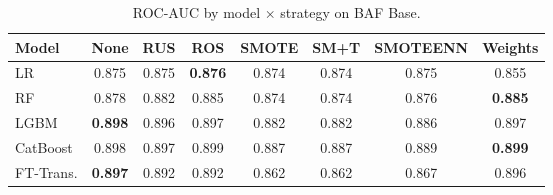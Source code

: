 \begin{table}[H]
\centering
\caption{ROC-AUC by model $\times$ strategy on BAF Base.}
\label{tab:factorial_baf_rocauc}
\begin{tabular}{l c c c c c c c}
\toprule
Model & None & RUS & ROS & SMOTE & SM+T & SMOTEENN & Weights \\
\midrule
LR         & 0.875 & 0.875 & \textbf{0.876} & 0.874 & 0.874 & 0.875 & 0.855 \\
RF         & 0.878 & 0.882 & 0.885 & 0.874 & 0.874 & 0.876 & \textbf{0.885} \\
LGBM       & \textbf{0.898} & 0.896 & 0.897 & 0.882 & 0.882 & 0.886 & 0.897 \\
CatBoost   & 0.898 & 0.897 & 0.899 & 0.887 & 0.887 & 0.889 & \textbf{0.899} \\
FT-Trans.  & \textbf{0.897} & 0.892 & 0.892 & 0.862 & 0.862 & 0.867 & 0.896 \\
\bottomrule
\end{tabular}
\end{table}